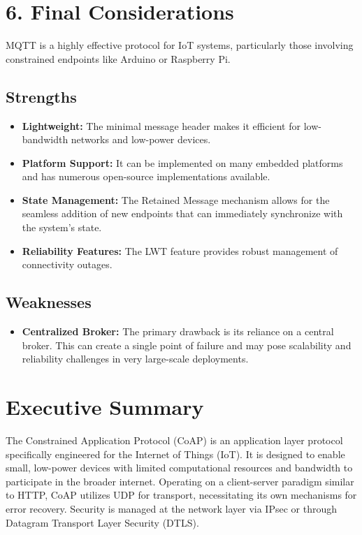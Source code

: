 \documentclass[a4paper, 12pt]{book} %
\begin{document}
\section{6. Final Considerations}\label{final-considerations}

MQTT is a highly effective protocol for IoT systems, particularly those
involving constrained endpoints like Arduino or Raspberry Pi.

\subsection{Strengths}\label{strengths}

\begin{itemize}
\tightlist
\item
  \textbf{Lightweight:} The minimal message header makes it efficient
  for low-bandwidth networks and low-power devices.
\item
  \textbf{Platform Support:} It can be implemented on many embedded
  platforms and has numerous open-source implementations available.
\item
  \textbf{State Management:} The Retained Message mechanism allows for
  the seamless addition of new endpoints that can immediately
  synchronize with the system's state.
\item
  \textbf{Reliability Features:} The LWT feature provides robust
  management of connectivity outages.
\end{itemize}

\subsection{Weaknesses}\label{weaknesses}

\begin{itemize}
\tightlist
\item
  \textbf{Centralized Broker:} The primary drawback is its reliance on a
  central broker. This can create a single point of failure and may pose
  scalability and reliability challenges in very large-scale
  deployments.
\end{itemize}


\section{Executive Summary}\label{executive-summary}

The Constrained Application Protocol (CoAP) is an application layer
protocol specifically engineered for the Internet of Things (IoT). It is
designed to enable small, low-power devices with limited computational
resources and bandwidth to participate in the broader internet.
Operating on a client-server paradigm similar to HTTP, CoAP utilizes UDP
for transport, necessitating its own mechanisms for error recovery.
Security is managed at the network layer via IPsec or through Datagram
Transport Layer Security (DTLS).
\end{document}

